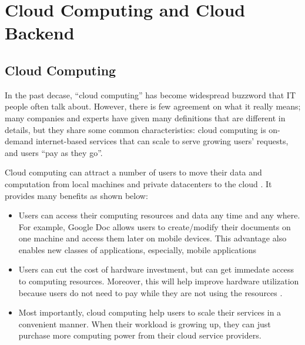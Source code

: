 \section{Cloud Computing and Cloud Backend}
\label{bg-cloud}

\subsection{Cloud Computing}

In the past decase, ``cloud computing'' has become widespread buzzword that IT
people often talk about. However, there is few agreement on what it really
means; many companies and experts have given many definitions
\cite{TwentyoneCloudDef, IBMCloudDef, PCMagCloudDef, Foster+08-CloudAndGrid}
that are different in details, but they share some common characteristics: cloud
computing is on-demand internet-based services that can scale to serve growing
users' requests, and users ``pay as they go''.


Cloud computing can attract a number of users to move their data and
computation from local machines and private datacenters to the cloud
\cite{AdobeCloudStat, AWSCustomer, GmailStat, GoogleDriveStat, DropboxStat,
AstroInCloud, FacebookStat, Luo+16-BigDataBioResearch}.
It provides many benefits as shown below:
\begin{itemize}
\item Users can access their computing resources and data any time and any
where. For example, Google Doc allows users to create/modify their documents on
one machine and access them later on mobile devices. This advantage also
enables new classes of applications, especially, mobile applications
\cite{DropboxWebsite, GmailWebsite, GoogleDriveWebsite, iCloudWebsite,
SiriWebsite} 

\item Users can cut the cost of hardware investment, but can get immedate access
to computing resources. Moreover, this will help improve hardware utilization
because users do not need to pay while they are not using the resources
\cite{Marston+11-CloudBusiness}.

\item Most importantly, cloud computing help users to scale their services in a
convenient manner. When their workload is growing up, they can just purchase
more computing power from their cloud service providers.
\end{itemize}

